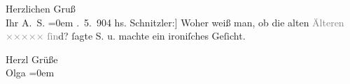            \vspace{1em}
\pstart
           {\pb}Herzlichen Gruß{\\[\baselineskip]}Ihr \spacefill\mbox{A. S.}\pend
           \leftskip=0em{}
. 5. 904\pend
           \vspace{1em}
\pstart
           \noindent{}{[}hs. Schnitzler:{]} Woher weiß man, ob die alten
                  \textcolor{gray}{Älteren}{ }\textcolor{gray}{×}\-\textcolor{gray}{×}\-\textcolor{gray}{×}\-\textcolor{gray}{×}\-\textcolor{gray}{×}{ }\textcolor{gray}{ſin}d? ſagte S. u. machte ein ironiſches Geſicht.\pend
           
\pstart
           Herzl Grüße{\\[\baselineskip]}\spacefill\mbox{Olga}\pend
           \leftskip=0em{}\endnumbering{}
\begin{anhang}
\end{anhang}\newcommand{\dateiname}{L04358}\newcommand{\titel}{Arthur und Olga Schnitzler an Gustav Schwarzkopf, 4. 5. 1904}\newcommand{\editorInnen}{Herausgegeben von Jahnke, SelmaMüller, Martin Anton}
